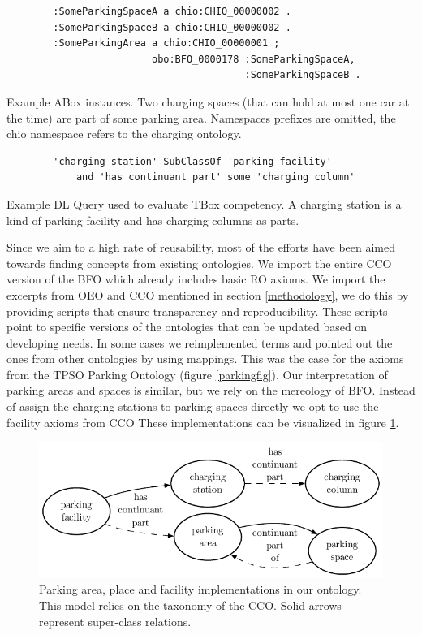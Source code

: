 \begin{listing}[h]
    \begin{verbatim}
        :SomeParkingSpaceA a chio:CHIO_00000002 .
        :SomeParkingSpaceB a chio:CHIO_00000002 .
        :SomeParkingArea a chio:CHIO_00000001 ;
                         obo:BFO_0000178 :SomeParkingSpaceA,
                                         :SomeParkingSpaceB .
    \end{verbatim}
    \caption{Example ABox instances. Two charging spaces (that can hold at most one car at the time) are part of some parking area. Namespaces prefixes are omitted, the chio namespace refers to the charging ontology.}
    \label{lst:2}
\end{listing}

\begin{listing}[h]
    \begin{verbatim}
        'charging station' SubClassOf 'parking facility' 
            and 'has continuant part' some 'charging column'
    \end{verbatim}
    \caption{Example DL Query used to evaluate TBox competency. A charging station is a kind of parking facility and has charging columns as parts.}
    \label{lst:3}
\end{listing}

Since we aim to a high rate of reusability, most of the efforts have been aimed
towards finding concepts from existing ontologies. We import the entire CCO
version of the BFO which already includes basic RO axioms. We import  the
excerpts from OEO and CCO mentioned in section \ref{methodology}, we do this by
providing scripts that ensure transparency and reproducibility. These scripts
point to specific versions of the ontologies that can be updated based on
developing needs. In some cases we reimplemented terms and pointed out the ones
from other ontologies by using mappings. This was the case for the axioms from
the TPSO Parking Ontology (figure \ref{parkingfig}). Our interpretation of
parking areas and spaces is similar, but we rely on the mereology of BFO.
Instead of assign the charging stations to parking spaces directly we opt to use
the facility axioms from CCO These implementations can be visualized in figure
\ref{parkingchio}.

\begin{figure}[h]
    \centering
    \includegraphics{images/CHIOParking.pdf}
    \caption{Parking area, place and facility implementations in our ontology. This model relies on the taxonomy of the CCO. Solid arrows represent super-class relations.}
    \label{parkingchio}
\end{figure}



    
